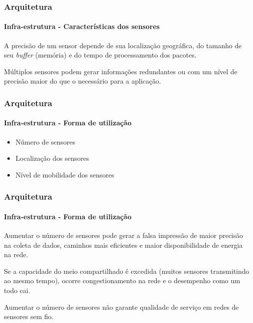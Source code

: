 \documentclass[notes]{beamer}
\begin{document}
\begin{frame}
\label{slide_33}
\frametitle{Arquitetura}
\framesubtitle{Infra-estrutura - Características dos sensores}

\begin{block}

A precisão de um sensor depende de sua localização geográfica, do tamanho de seu \textit{buffer} (memória) e do tempo de processamento dos pacotes. 

\end{block} \pause

\begin{alertblock}

Múltiplos sensores podem gerar informações redundantes ou com um nível de precisão maior do que o necessário para a aplicação. 

\end{alertblock}

\end{frame}

\begin{frame}
\label{slide_34}
\frametitle{Arquitetura}
\framesubtitle{Infra-estrutura - Forma de utilização}

\begin{block}

\begin{itemize}

\item Número de sensores \pause
\item Localização dos sensores \pause
\item Nível de mobilidade dos sensores

\end{itemize}

\end{block}

\end{frame}

\begin{frame}
\label{slide_35}
\frametitle{Arquitetura}
\framesubtitle{Infra-estrutura - Forma de utilização}

\begin{block}

Aumentar o número de sensores pode gerar a falsa impressão de maior precisão na coleta de dados, caminhos mais eficientes e maior disponibilidade de energia na rede. 
\end{block} \pause

\begin{alertblock}

Se a capacidade do meio compartilhado é excedida (muitos sensores transmitindo ao mesmo tempo), ocorre congestionamento na rede e o desempenho como um todo cai.

\end{alertblock} \pause

\begin{alertblock}

Aumentar o número de sensores não garante qualidade de serviço em redes de sensores sem fio.

\end{alertblock}

\end{frame}
\end{document}
